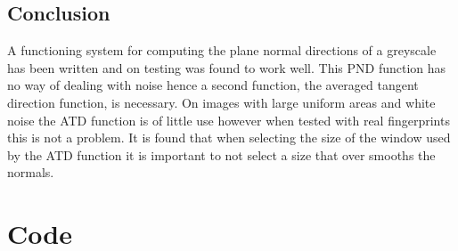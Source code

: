 \documentclass[11pt,a4paper]{article}
\begin{document}
\begin{multicols}{2}
\section{Conclusion}
	A functioning system for computing the plane normal directions of a greyscale has been written and on testing was found to work well. This PND function has no way of dealing with noise hence a second function, the averaged tangent direction function, is necessary. On images with large uniform areas and white noise the ATD function is of little use however when tested with real fingerprints this is not a problem. It is found that when selecting the size of the window used by the ATD function it is important to not select a size that over smooths the normals.

\printbibliography
\end{multicols}

\appendix
\section{Code}
	
\end{document}

